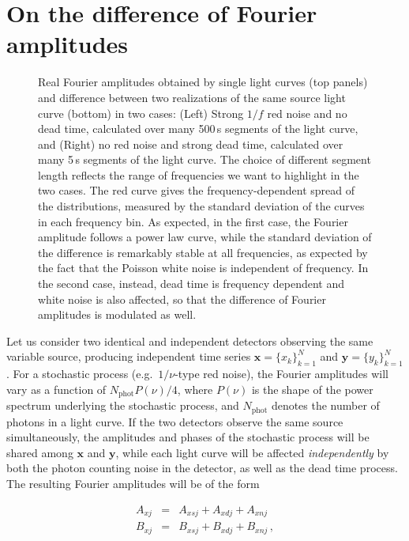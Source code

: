 \documentclass[twocolumn]{aastex61}
\begin{document}
\section{On the difference of Fourier amplitudes} \label{sec:fourierdiff}
\begin{figure*}
\caption{Real Fourier amplitudes obtained by single light curves (top panels) and difference between two realizations of the same source light curve (bottom) in two cases: (Left) Strong $1/f$ red noise and no dead time, calculated over many 500\,s segments of the light curve, and (Right) no red noise and strong dead time, calculated over many 5\,s segments of the light curve. 
The choice of different segment length reflects the range of frequencies we want to highlight in the two cases.
The red curve gives the frequency-dependent spread of the distributions, measured by the standard deviation of the curves in each frequency bin. 
As expected, in the first case, the Fourier amplitude follows a power law curve, while the standard deviation of the difference is remarkably stable at all frequencies, as expected by the fact that the Poisson white noise is independent of frequency. 
In the second case, instead, dead time is frequency dependent and white noise is also affected, so that the difference of Fourier amplitudes is modulated as well.}
\label{fig:fourierdiff}
\end{figure*}

Let us consider two identical and independent detectors observing the same variable source, producing independent time series $\mathbf{x} = \{x_k\}_{k=1}^N$ and $\mathbf{y} = \{y_k\}_{k=1}^N$. For a stochastic process (e.g.\ $1/\nu$-type red noise), the Fourier amplitudes will vary as a function of $N_{\mathrm{phot}}P(\nu)/4$, where $P(\nu)$ is the shape of the power spectrum underlying the stochastic process, and $N_{\mathrm{phot}}$ denotes the number of photons in a light curve. If the two detectors observe the same source simultaneously, the amplitudes and phases of the stochastic process will be shared among $\mathbf{x}$ and $\mathbf{y}$, while each light curve will be affected \textit{independently} by both the photon counting noise in the detector, as well as the dead time process. The resulting Fourier amplitudes will be of the form

\begin{eqnarray}
A_{xj} &=& A_{xsj} + A_{xdj} + A_{xnj} \nonumber \\
B_{xj} &=& B_{xsj} + B_{xdj} + B_{xnj} \, ,
\end{eqnarray}
\end{document}
